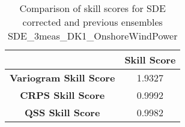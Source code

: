 
        \begin{table}[h!]
            \centering
            \begin{tabular}{|c|c|}
                \hline
                & \textbf{Skill Score}  \\
                \hline
                \textbf{Variogram Skill Score} & 1.9327  \\
                \hline
                \textbf{CRPS Skill Score} & 0.9992  \\
                \hline
                \textbf{QSS Skill Score} & 0.9982 \\
                \hline
            \end{tabular}
            \caption{Comparison of skill scores for SDE corrected and previous ensembles SDE_3meas_DK1_OnshoreWindPower}
            \label{table:skill_scores_comparison}
        \end{table}
        